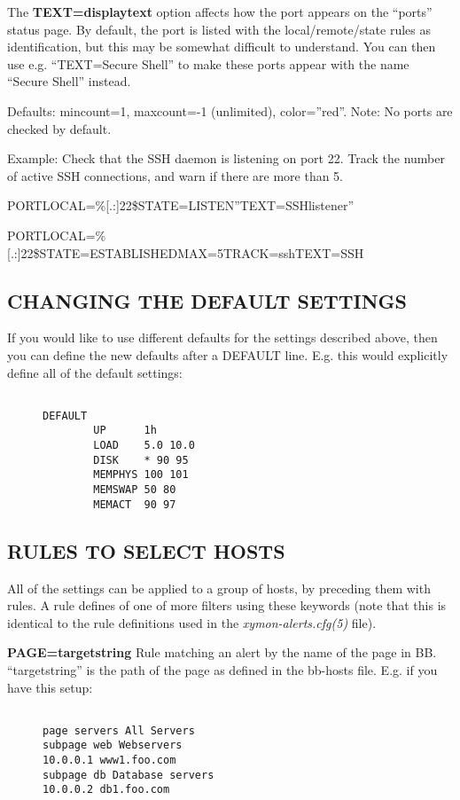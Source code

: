   The \textbf{TEXT=displaytext}
 option affects how the port appears on the ``ports'' status page. By default, the port is listed with the local/remote/state rules as identification, but this may be somewhat difficult to understand. You can then use e.g. ``TEXT=Secure Shell'' to make these ports appear with the name ``Secure Shell'' instead. 


  Defaults: mincount=1, maxcount=-1 (unlimited), color=''red''. Note: No ports are checked by default. 


  Example: Check that the SSH daemon is listening on port 22. Track the number of active SSH connections, and warn if there are more than 5.  
 
PORTLOCAL=\%[.:]22\$STATE=LISTEN''TEXT=SSHlistener''  
 
PORTLOCAL=\%[.:]22\$STATE=ESTABLISHEDMAX=5TRACK=sshTEXT=SSH 


 
\subsection{CHANGING THE DEFAULT SETTINGS}
 If you would like to use different defaults for the settings described above, then you can define the new defaults after a DEFAULT line. E.g. this would explicitly define all of the default settings: \begin{description}
\item[]\begin{verbatim}

DEFAULT
        UP      1h
        LOAD    5.0 10.0
        DISK    * 90 95
        MEMPHYS 100 101
        MEMSWAP 50 80
        MEMACT  90 97

\end{verbatim}


\end{description}


 


 
\subsection{RULES TO SELECT HOSTS}
 All of the settings can be applied to a group of hosts, by preceding them with rules. A rule defines of one of more filters using these keywords (note that this is identical to the rule definitions used in the \emph{xymon-alerts.cfg(5)}
 file). 

 \textbf{PAGE=targetstring}
 Rule matching an alert by the name of the page in
 BB. ``targetstring'' is the path of the page as defined in the
 bb-hosts file. E.g. if you have this setup: \begin{description}

\item[]\begin{verbatim}

page servers All Servers
subpage web Webservers
10.0.0.1 www1.foo.com
subpage db Database servers
10.0.0.2 db1.foo.com

\end{verbatim}


\end{description}



